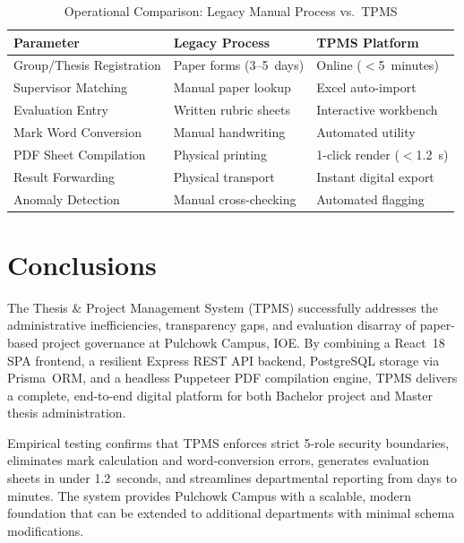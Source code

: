 \documentclass[12pt]{report}
\begin{document}
\begin{table}[H]
\centering
\caption{Operational Comparison: Legacy Manual Process vs.\ TPMS}
\label{tab:comparison}
\begin{tabular}{l l l}
\toprule
\textbf{Parameter} & \textbf{Legacy Process} & \textbf{TPMS Platform}\\
\midrule
Group/Thesis Registration & Paper forms (3--5~days) & Online ($<$5~minutes)\\
Supervisor Matching       & Manual paper lookup     & Excel auto-import\\
Evaluation Entry          & Written rubric sheets   & Interactive workbench\\
Mark Word Conversion      & Manual handwriting      & Automated utility\\
PDF Sheet Compilation     & Physical printing       & 1-click render ($<$1.2~s)\\
Result Forwarding         & Physical transport      & Instant digital export\\
Anomaly Detection         & Manual cross-checking   & Automated flagging\\
\bottomrule
\end{tabular}
\end{table}

\chapter{Conclusions}
The Thesis \& Project Management System (TPMS) successfully addresses the
administrative inefficiencies, transparency gaps, and evaluation disarray of
paper-based project governance at Pulchowk Campus, IOE. By combining a React~18 SPA
frontend, a resilient Express REST API backend, PostgreSQL storage via Prisma~ORM, and
a headless Puppeteer PDF compilation engine, TPMS delivers a complete, end-to-end
digital platform for both Bachelor project and Master thesis administration.

Empirical testing confirms that TPMS enforces strict 5-role security boundaries,
eliminates mark calculation and word-conversion errors, generates evaluation sheets in
under 1.2~seconds, and streamlines departmental reporting from days to minutes. The
system provides Pulchowk Campus with a scalable, modern foundation that can be extended
to additional departments with minimal schema modifications.
\end{document}
